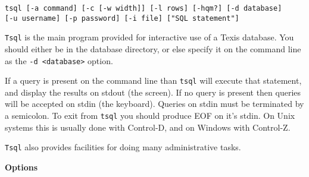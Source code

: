 
\SYNOPSIS
\begin{verbatim}
tsql [-a command] [-c [-w width]] [-l rows] [-hqm?] [-d database]
[-u username] [-p password] [-i file] ["SQL statement"]
\end{verbatim}

\DESCRIPTION

{\tt Tsql} is the main program provided for interactive use of a Texis
database.  You should either be in the database directory, or else
specify it on the command line as the {\tt -d <database>} option.

If a query is present on the command line than {\tt tsql} will execute
that statement, and display the results on stdout (the screen).  If no
query is present then queries will be accepted on stdin (the
keyboard).  Queries on stdin must be terminated by a semicolon.  To
exit from {\tt tsql} you should produce EOF on it's stdin.  On Unix
systems this is usually done with Control-D, and on Windows with
Control-Z.

{\tt Tsql} also provides facilities for doing many administrative
tasks.

{\bf Options}

